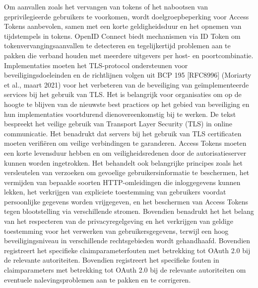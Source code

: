\newline
Om aanvallen zoals het vervangen van tokens of het nabootsen van geprivilegieerde gebruikers te voorkomen, wordt doelgroepbeperking voor Access Tokens aanbevolen, samen met een korte geldigheidsduur en het opnemen van tijdstempels in tokens.
\newline
OpenID Connect biedt mechanismen via ID Token om tokenvervangingsaanvallen te detecteren en tegelijkertijd problemen aan te pakken die verband houden met meerdere uitgevers per host- en poortcombinatie.
\newline
Implementaties moeten het TLS-protocol ondersteunen voor beveiligingsdoeleinden en de richtlijnen volgen uit BCP 195 [RFC8996] (Moriarty et al., maart 2021) voor het verbeteren van de beveiliging van geïmplementeerde services bij het gebruik van TLS.
Het is belangrijk voor organisaties om op de hoogte te blijven van de nieuwste best practices op het gebied van beveiliging en hun implementaties voortdurend dienovereenkomstig bij te werken.
\newline
De tekst bespreekt het veilige gebruik van Transport Layer Security (TLS) in online communicatie. Het benadrukt dat servers bij het gebruik van TLS certificaten moeten verifiëren om veilige verbindingen te garanderen. Access Tokens moeten een korte levensduur hebben en om veiligheidsredenen door de autorisatieserver kunnen worden ingetrokken.
\newline
Het behandelt ook belangrijke principes zoals het versleutelen van verzoeken om gevoelige gebruikersinformatie te beschermen, het vermijden van bepaalde soorten HTTP-omleidingen die inloggegevens kunnen lekken, het verkrijgen van expliciete toestemming van gebruikers voordat persoonlijke gegevens worden vrijgegeven, en het beschermen van Access Tokens tegen blootstelling via verschillende stromen.
\newline
Bovendien benadrukt het het belang van het respecteren van de privacyregelgeving en het verkrijgen van geldige toestemming voor het verwerken van gebruikersgegevens, terwijl een hoog beveiligingsniveau in verschillende rechtsgebieden wordt gehandhaafd.
\newline
Bovendien registreert het specifieke claimparameterfouten met betrekking tot OAuth 2.0 bij de relevante autoriteiten.
\newline
\newline
Bovendien registreert het specifieke fouten in claimparameters met betrekking tot OAuth 2.0 bij de relevante autoriteiten om eventuele nalevingsproblemen aan te pakken en te corrigeren.
